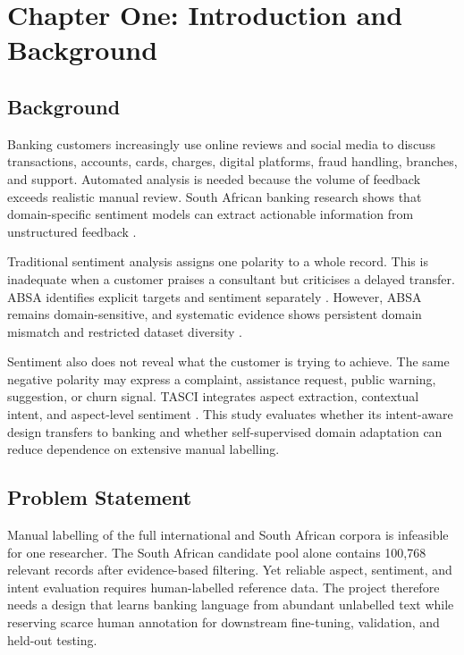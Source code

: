 \documentclass[11pt,a4paper]{article}
\begin{document}
\clearpage
{}
{}
\tableofcontents
\clearpage

\section{Chapter One: Introduction and Background}
\subsection{Background}
Banking customers increasingly use online reviews and social media to discuss transactions, accounts, cards, charges, digital platforms, fraud handling, branches, and support. Automated analysis is needed because the volume of feedback exceeds realistic manual review. South African banking research shows that domain-specific sentiment models can extract actionable information from unstructured feedback \citep{kazmaier2020,semenya2024}.

Traditional sentiment analysis assigns one polarity to a whole record. This is inadequate when a customer praises a consultant but criticises a delayed transfer. ABSA identifies explicit targets and sentiment separately \citep{hu2004,pontiki2014}. However, ABSA remains domain-sensitive, and systematic evidence shows persistent domain mismatch and restricted dataset diversity \citep{hua2024}.

Sentiment also does not reveal what the customer is trying to achieve. The same negative polarity may express a complaint, assistance request, public warning, suggestion, or churn signal. TASCI integrates aspect extraction, contextual intent, and aspect-level sentiment \citep{chaudhry2025}. This study evaluates whether its intent-aware design transfers to banking and whether self-supervised domain adaptation can reduce dependence on extensive manual labelling.

\subsection{Problem Statement}
Manual labelling of the full international and South African corpora is infeasible for one researcher. The South African candidate pool alone contains 100,768 relevant records after evidence-based filtering. Yet reliable aspect, sentiment, and intent evaluation requires human-labelled reference data. The project therefore needs a design that learns banking language from abundant unlabelled text while reserving scarce human annotation for downstream fine-tuning, validation, and held-out testing.
\end{document}
